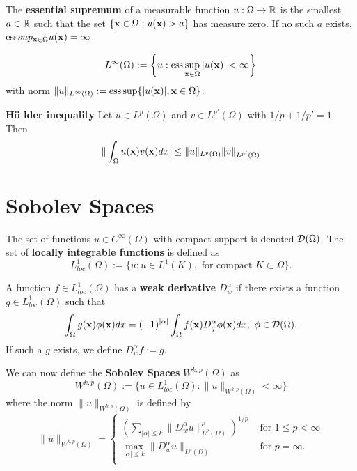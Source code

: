 \begin{defn}
The \textbf{essential supremum} of a measurable function $u: \Omega \rightarrow \mathbb{R}$ is the smallest $a \in \mathbb{R}$ such that the set $\{\mathbf{x} \in \Omega : u(\mathbf{x}) > a \}$ has measure zero. If no such $a$ exists, $ \mbox{ess} sup_{\mathbf{x} \in \Omega} u(\mathbf{x}) = \infty $.
\end{defn}

\begin{equation}
\label{def:LinfSpace}
L^{\infty}(\Omega) := \left \lbrace u : \mbox{ess} \sup_{\mathbf{x} \in \Omega} | u(\mathbf{x}) | < \infty \right\rbrace
\end{equation}
with norm $\|u \|_{L^{\infty}(\Omega)} := \mbox{ess} \sup \{ | u(\mathbf{x}) |, \mathbf{x} \in \Omega \}$.

\begin{lemma}
\textbf{H\"o lder inequality}
Let $u\in L^p(\Omega)$ and $v\in L^{p'}(\Omega)$ with $1/p + 1/p' =1$. Then
\[ \| \int_{\Omega} u(\mathbf{x})v(\mathbf{x})dx | \leq \| u \|_{L^p(\Omega)} \| v \|_{L^{p'}(\Omega)} \]
\end{lemma}

\section{Sobolev Spaces}
The set of functions $u \in C^{\infty} (\Omega)$ with compact support is denoted $\mathcal{D}(\Omega)$. The set of \textbf{locally integrable functions} is defined as 
\[ L^1_{loc}(\Omega) := \{u : u\in L^1(K), \mbox{ for compact } K \subset \Omega \}. \]

\begin{defn}
A function $f \in L^1_{loc}(\Omega)$ has a \textbf{weak derivative} $D^{\alpha}_w $ if there exists a function $g \in L^1_{loc}(\Omega)$ such that
\[ \int_{\Omega} g(\mathbf{x}) \phi (\mathbf{x}) dx = (-1)^{|\alpha |} \int_{\Omega} f(\mathbf{x})D^{\alpha}_q \phi (\mathbf{x}) dx,\mbox{ } \phi\in \mathcal{D}(\Omega). \]
If such a $g$ exists, we define $D^{\alpha}_w f := g$. 
\end{defn}

We can now define the \textbf{Sobolev Spaces} $W^{k,p}(\Omega)$ as
\[  W^{k,p}(\Omega) := \{ u\in L^1_{loc}(\Omega) : \|u \|_{W^{k,p}(\Omega)} < \infty \} \]
where the norm $\|u \|_{W^{k,p}(\Omega)}$ is defined by
\[\|u \|_{W^{k,p}(\Omega)} = \left\{ \begin{array}{ll}
 \left( \sum_{|\alpha| \leq k} \|D^{\alpha}_w u \|^p_{L^p(\Omega)} \right)^{1/p} &\mbox{ for } 1 \leq p < \infty \\
  \max_{|\alpha|\leq k} \|D^{\alpha}_w u \|_{L^p(\Omega)} &\mbox{ for } p=\infty. \\
       \end{array} \right. \]

